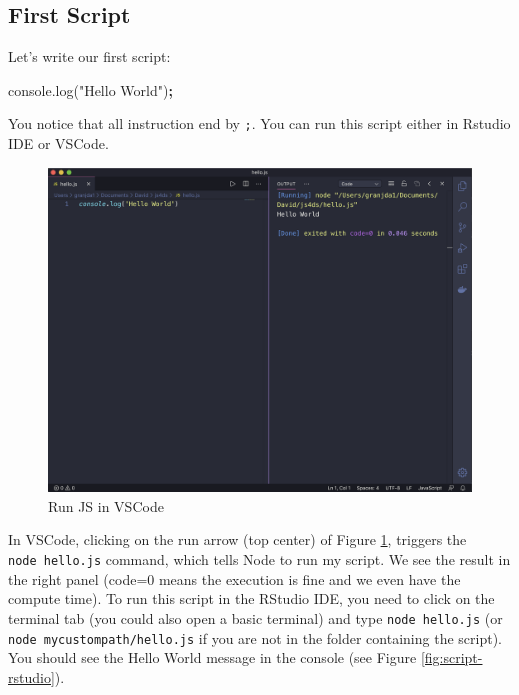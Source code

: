 \documentclass[]{book}
\newenvironment{Shaded}{\begin{snugshade}}{\end{snugshade}}
\newcommand{\AttributeTok}[1]{\textcolor[rgb]{0.77,0.63,0.00}{#1}}
\newcommand{\NormalTok}[1]{#1}
\newcommand{\OperatorTok}[1]{\textcolor[rgb]{0.81,0.36,0.00}{\textbf{#1}}}
\newcommand{\StringTok}[1]{\textcolor[rgb]{0.31,0.60,0.02}{#1}}
\newcommand{\VariableTok}[1]{\textcolor[rgb]{0.00,0.00,0.00}{#1}}
\begin{document}
\hypertarget{first-script}{%
\subsection{First Script}\label{first-script}}

Let's write our first script:

\begin{Shaded}
\begin{Highlighting}[]
\VariableTok{console}\NormalTok{.}\AttributeTok{log}\NormalTok{(}\StringTok{"Hello World"}\NormalTok{)}\OperatorTok{;}
\end{Highlighting}
\end{Shaded}

You notice that all instruction end by \texttt{;}. You can run this script either in Rstudio IDE or VSCode.

\begin{figure}
\includegraphics[width=29.61in]{images/survival-kit/script-vscode} \caption{Run JS in VSCode}\label{fig:script-vscode}
\end{figure}

In VSCode, clicking on the run arrow (top center) of Figure \ref{fig:script-vscode},
triggers the \texttt{node\ hello.js} command, which tells Node to run my script. We see the result in the right panel (code=0 means the execution is fine and we even have the compute time). To run this script in the RStudio IDE, you need to click on the terminal tab (you could also open a basic terminal) and type \texttt{node\ hello.js} (or \texttt{node\ mycustompath/hello.js} if you are not in the folder containing the script). You should see the Hello World message in the console (see Figure \ref{fig:script-rstudio}).
\end{document}
